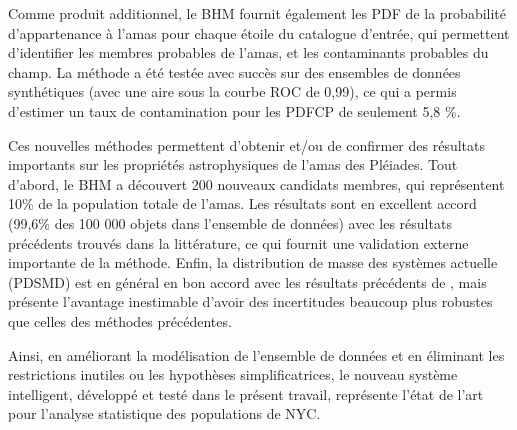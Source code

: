 Comme produit additionnel, le BHM fournit également les PDF de la probabilité d'appartenance à l'amas pour chaque étoile du catalogue d'entrée, qui permettent d'identifier les membres probables de l'amas, et les contaminants probables du champ. La méthode a été testée avec succès sur des ensembles de données synthétiques (avec une aire sous la courbe ROC de 0,99), ce qui a permis d'estimer un taux de contamination pour les PDFCP de seulement 5,8 \%.

Ces nouvelles méthodes permettent d'obtenir et/ou de confirmer des résultats importants sur les propriétés astrophysiques de l'amas des Pléiades. Tout d'abord, le BHM a découvert 200 nouveaux candidats membres, qui représentent 10\% de la population totale de l'amas. Les résultats sont en excellent accord (99,6\% des 100 000 objets dans l'ensemble de données) avec les résultats précédents trouvés dans la littérature, ce qui fournit une validation externe importante de la méthode. Enfin, la distribution de masse des systèmes actuelle (PDSMD) est en général en bon accord avec les résultats précédents de \citet{Bouy2015}, mais présente l'avantage inestimable d'avoir des incertitudes beaucoup plus robustes que celles des méthodes précédentes.

Ainsi, en améliorant la modélisation de l'ensemble de données et en éliminant les restrictions inutiles ou les hypothèses simplificatrices, le nouveau système intelligent, développé et testé dans le présent travail, représente l'état de l'art pour l'analyse statistique des populations de NYC.
